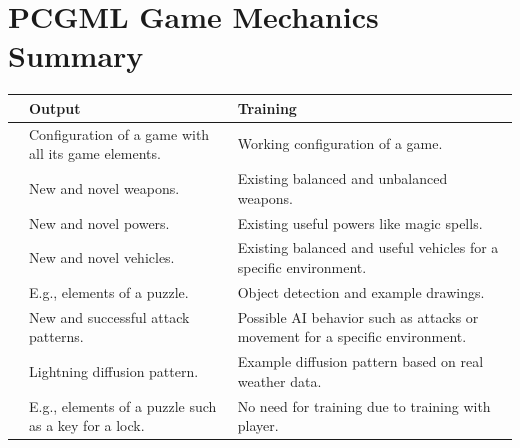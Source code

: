 \documentclass[MGS,Master,english]{twbook}%
\begin{document}
\chapter{\acl{PCGML} Game Mechanics Summary} \label{gameMechanicIdeaSummary}
\begin{longtable}[c]{p{4cm}|p{5.5cm}|p{5.5cm}|}
	\cline{2-3}
	                               & \textbf{Output}                                               & \textbf{Training}                                                                              \\ \hline

	\endhead
		\multicolumn{1}{|p{4cm}|}{\textbf{\nameref{idea::rulesAndBehavior}}}       & Configuration of a game with all its game elements.  & Working configuration of a game.                                                      \\ \hline
		\multicolumn{1}{|p{4cm}|}{\textbf{\nameref{idea::changingWeapons}}}        & New and novel weapons.                               & Existing balanced and unbalanced weapons.                                             \\ \hline
		\multicolumn{1}{|p{4cm}|}{\textbf{\nameref{idea::changingPowers}} }        & New and novel powers.                                & Existing useful powers like magic spells.                                             \\ \hline
		\multicolumn{1}{|p{4cm}|}{\textbf{\nameref{idea::novelCars}}     }         & New and novel vehicles.                              & Existing balanced and useful vehicles for a specific environment.                     \\ \hline
		\multicolumn{1}{|p{4cm}|}{\textbf{\nameref{idea::solverWeapon}}}           & E.g., elements of a puzzle.                          & Object detection and example drawings.                                                \\ \hline
		\multicolumn{1}{|p{4cm}|}{\textbf{\nameref{idea::defeatTheEnemy}} }        & New and successful attack patterns.                  & Possible \ac{AI} behavior such as attacks or movement for a specific environment.          \\ \hline
		\multicolumn{1}{|p{4cm}|}{\textbf{\nameref{idea::caughtInAThunderstorm}}}  & Lightning diffusion pattern.                         & Example diffusion pattern based on real weather data.                                 \\ \hline
		\multicolumn{1}{|p{4cm}|}{\textbf{\nameref{idea::trainToProgress}} }       & E.g., elements of a puzzle such as a key for a lock. & No need for training due to training with player.                                     \\ \hline

\end{longtable}
\end{document}
